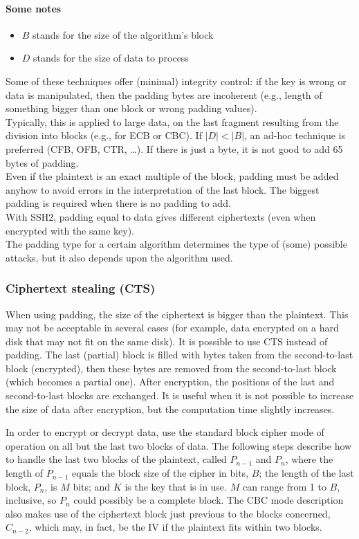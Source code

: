 \paragraph{Some notes}
\begin{itemize}
	\item $B$ stands for the size of the algorithm's block
	\item $D$ stands for the size of data to process
\end{itemize}

Some of these techniques offer (minimal) integrity control: if the key is wrong or data is manipulated, then the
padding bytes are incoherent (e.g., length of something bigger than one block or wrong padding values).\\
Typically, this is applied to large data, on the last fragment resulting from the division into blocks (e.g., for ECB
or CBC). If $|D| < |B|$, an ad-hoc technique is preferred (CFB, OFB, CTR, …). If there is just a byte, it is not
good to add 65 bytes of padding.\\
Even if the plaintext is an exact multiple of the block, padding must be added anyhow to avoid errors in the
interpretation of the last block. The biggest padding is required when there is no padding to add.\\
With SSH2, padding equal to data gives different ciphertexts (even when encrypted with the same key).\\
The padding type for a certain algorithm determines the type of (some) possible attacks, but it also depends
upon the algorithm used.

\subsubsection{Ciphertext stealing (CTS)}
When using padding, the size of the ciphertext is bigger than the plaintext. This may not be acceptable in
several cases (for example, data encrypted on a hard disk that may not fit on the same disk). It is possible to use
CTS instead of padding. The last (partial) block is filled with bytes taken from the second-to-last block
(encrypted), then these bytes are removed from the second-to-last block (which becomes a partial one). After
encryption, the positions of the last and second-to-last blocks are exchanged.
It is useful when it is not possible to increase the size of data after encryption, but the computation time slightly increases.

In order to encrypt or decrypt data, use the standard block cipher mode of operation on all but the last two blocks of data.
The following steps describe how to handle the last two blocks of the plaintext, called \(P_{n-1}\) and \(P_n\), where the length of \(P_{n-1}\) equals the block size of the cipher in bits, \(B\); the length of the last block, \(P_n\), is \(M\) bits; and \(K\) is the key that is in use. \(M\) can range from 1 to \(B\), inclusive, so \(P_n\) could possibly be a complete block. The CBC mode description also makes use of the ciphertext block just previous to the blocks concerned, \(C_{n-2}\), which may, in fact, be the IV if the plaintext fits within two blocks.

